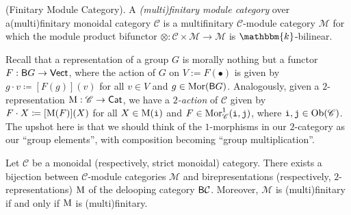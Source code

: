 \noindent\begin{definition}\textnormal{(Finitary Module Category).} A {\em (multi)finitary module category} over a\linebreak (multi)finitary monoidal category $\mathcal{C}$ is a multifinitary $\mathcal{C}$-module category $\mathcal{M}$ for which the module product bifunctor $\otimes : \mathcal{C} \times \mathcal{M} \to \mathcal{M}$ is $\mathbbm{k}$-bilinear.\\
\end{definition}



\noindent\begin{remark} Recall that a representation of a group $G$ is morally nothing but a functor\linebreak $F : \textnormal{\textsf{B}}G \to \textnormal{\textsf{Vect}}$, where the action of $G$ on $V := F(\bullet)$ is given by $g \cdot v \coloneqq [F(g)](v)$ for all $v \in V$ and $g \in \textnormal{Mor}(\textnormal{\textsf{B}}G)$. Analogously, given a $2$-representation $\textnormal{M} : \mathscr{C} \to \textnormal{\textsf{Cat}}$, we have a {\em $2$-action} of $\mathscr{C}$ given by $F \cdot X \coloneqq [\textnormal{M}(F)](X)$ for all $X \in \textnormal{M}(\textnormal{\texttt{i}})$ and $F \in \textnormal{Mor}_\mathscr{C}^1(\textnormal{\texttt{i}}, \textnormal{\texttt{j}})$, where $\textnormal{\texttt{i}}, \textnormal{\texttt{j}} \in \textnormal{Ob}(\mathscr{C})$. The upshot here is that we should think of the $1$-morphisms in our $2$-category as our ``group elements'', with composition becoming ``group multiplication''.\newpage %
\end{remark}

\noindent\begin{proposition}\label{ModuleBireps} Let $\mathcal{C}$ be a monoidal (respectively, strict monoidal) category. There exists a bijection between $\mathcal{C}$-module categories $\mathcal{M}$ and birepresentations (respectively, $2$-representations) $\textnormal{M}$ of the delooping category $\textnormal{\textsf{B}}\mathcal{C}$. Moreover, $\mathcal{M}$ is (multi)finitary if and only if $\textnormal{M}$ is (multi)finitary.\\
\end{proposition}

